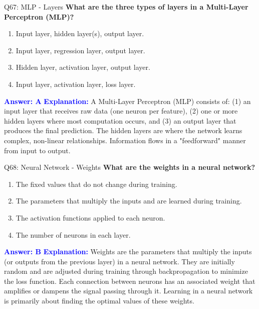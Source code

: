 \documentclass[8pt]{beamer}
\begin{document}
	\begin{frame}{Q67: MLP - Layers}
		\fontsize{6.5}{7.5}\selectfont
		\textbf{What are the three types of layers in a Multi-Layer Perceptron (MLP)?}
		\begin{enumerate}
			\item Input layer, hidden layer(s), output layer.
			\item Input layer, regression layer, output layer.
			\item Hidden layer, activation layer, output layer.
			\item Input layer, activation layer, loss layer.
		\end{enumerate}
		\vspace{0.1cm}
		\textcolor{blue}{\textbf{Answer: A}}
		\vspace{0.1cm}
		\textcolor{blue}{\textbf{Explanation:}} A Multi-Layer Perceptron (MLP) consists of: (1) an input layer that receives raw data (one neuron per feature), (2) one or more hidden layers where most computation occurs, and (3) an output layer that produces the final prediction. The hidden layers are where the network learns complex, non-linear relationships. Information flows in a "feedforward" manner from input to output.
	\end{frame}
	
	\begin{frame}{Q68: Neural Network - Weights}
		\fontsize{6.5}{7.5}\selectfont
		\textbf{What are the weights in a neural network?}
		\begin{enumerate}
			\item The fixed values that do not change during training.
			\item The parameters that multiply the inputs and are learned during training.
			\item The activation functions applied to each neuron.
			\item The number of neurons in each layer.
		\end{enumerate}
		\vspace{0.1cm}
		\textcolor{blue}{\textbf{Answer: B}}
		\vspace{0.1cm}
		\textcolor{blue}{\textbf{Explanation:}} Weights are the parameters that multiply the inputs (or outputs from the previous layer) in a neural network. They are initially random and are adjusted during training through backpropagation to minimize the loss function. Each connection between neurons has an associated weight that amplifies or dampens the signal passing through it. Learning in a neural network is primarily about finding the optimal values of these weights.
	\end{frame}
	
\end{document}
